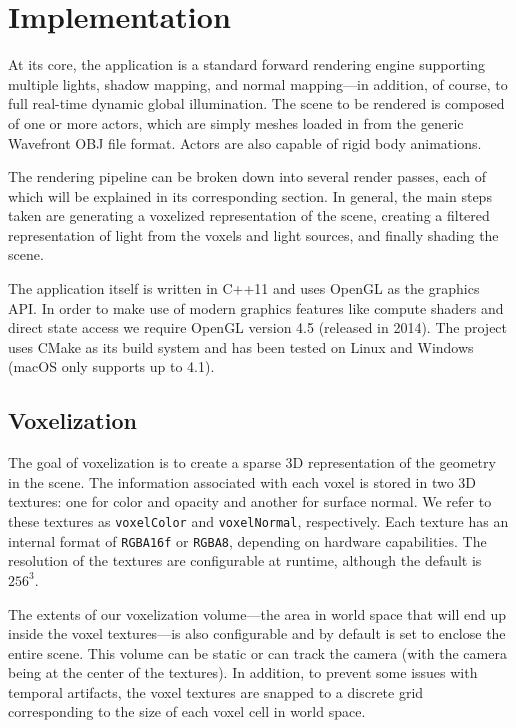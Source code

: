\chapter{Implementation}

At its core, the application is a standard forward rendering engine supporting multiple lights, shadow mapping, and normal mapping---in addition, of course, to full real-time dynamic global illumination. The scene to be rendered is composed of one or more actors, which are simply meshes loaded in from the generic Wavefront OBJ file format. Actors are also capable of rigid body animations.

The rendering pipeline can be broken down into several render passes, each of which will be explained in its corresponding section. In general, the main steps taken are generating a voxelized representation of the scene, creating a filtered representation of light from the voxels and light sources, and finally shading the scene.

The application itself is written in C++11 and uses OpenGL as the graphics API. In order to make use of modern graphics features like compute shaders and direct state access we require OpenGL version 4.5 (released in 2014). The project uses CMake as its build system and has been tested on Linux and Windows (macOS only supports up to 4.1).

\section{Voxelization}
The goal of voxelization is to create a sparse 3D representation of the geometry in the scene. The information associated with each voxel is stored in two 3D textures: one for color and opacity and another for surface normal. We refer to these textures as \texttt{voxelColor} and \texttt{voxelNormal}, respectively. Each texture has an internal format of \texttt{RGBA16f} or \texttt{RGBA8}, depending on hardware capabilities. The resolution of the textures are configurable at runtime, although the default is $256^3$.

The extents of our voxelization volume---the area in world space that will end up inside the voxel textures---is also configurable and by default is set to enclose the entire scene. This volume can be static or can track the camera (with the camera being at the center of the textures). In addition, to prevent some issues with temporal artifacts, the voxel textures are snapped to a discrete grid corresponding to the size of each voxel cell in world space.

